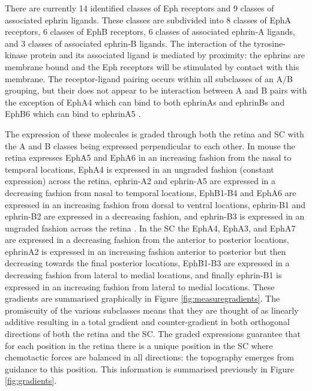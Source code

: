 There are currently 14 identified classes of Eph receptors and 9 classes of associated ephrin ligands. These classes are subdivided into 8 classes of EphA receptors, 6 classes of EphB receptors, 6 classes of associated ephrin-A ligands, and 3 classes of associated ephrin-B ligands. The interaction of the tyrosine-kinase protein and its associated ligand is mediated by proximity: the ephrins are membrane bound and the Eph receptors will be stimulated by contact with this membrane. The receptor-ligand pairing occurs within all subclasses of an A/B grouping, but their does not appear to be interaction between A and B pairs with the exception of EphA4 which can bind to both ephrinAs and ephrinBs and EphB6 which can bind to ephrinA5 \cite{McLaughlin2005-jd, Lemke2005-iz, Gale1996-zd, Himanen2004-jj}.

The expression of these molecules is graded through both the retina and SC with the A and B classes being expressed perpendicular to each other. In mouse the retina expresses EphA5 and EphA6 in an increasing fashion from the nasal to temporal locations, EphA4 is expressed in an ungraded fashion (constant expression) across the retina, ephrin-A2 and ephrin-A5 are expressed in a decreasing fashion from nasal to temporal locations, EphB1-B4 and EphA6 are expressed in an increasing fashion from dorsal to ventral locations, ephrin-B1 and ephrin-B2 are expressed in a decreasing fashion, and ephrin-B3 is expressed in an ungraded fashion across the retina  \cite{McLaughlin2005-jd, Lemke2005-iz}. In the SC the EphA4, EphA3, and EphA7 are expressed in a decreasing fashion from the anterior to posterior locations, ephrinA2 is expressed in an increasing fashion anterior to posterior but then decreasing towards the final posterior locations, EphB1-B3 are expressed in a decreasing fashion from lateral to medial locations, and finally ephrin-B1 is expressed in an increasing fashion from lateral to medial locations. These gradients are summarised graphically in Figure \ref{fig:measuregradients}. The promiscuity of the various subclasses means that they are thought of as linearly additive resulting in a total gradient and counter-gradient in both orthogonal directions of both the retina and the SC. The graded expressions guarantee that for each position in the retina there is a unique position in the SC where chemotactic forces are balanced in all directions: the topography emerges from guidance to this position. This information is summarised previously in Figure \ref{fig:gradients}.

